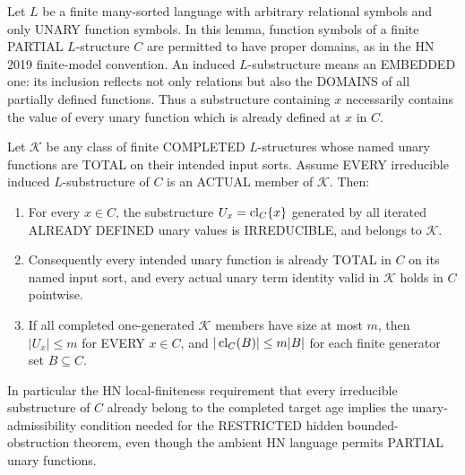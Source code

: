 \begin{lemma}
\label{lem:hn-irreducible-forces-unary-admissible}
Let $L$ be a finite many-sorted language with arbitrary
relational symbols and only UNARY function symbols.
In this lemma, function symbols of a finite PARTIAL
$L$-structure $C$ are permitted to have proper domains,
as in the HN 2019 finite-model convention.
An induced $L$-substructure means an EMBEDDED one:
its inclusion reflects not only relations but also
the DOMAINS of all partially defined functions.
Thus a substructure containing $x$ necessarily
contains the value of every unary function which
is already defined at $x$ in $C$.

Let $\mathcal K$ be any class of finite COMPLETED
$L$-structures whose named unary functions are
TOTAL on their intended input sorts.
Assume EVERY irreducible induced $L$-substructure
of $C$ is an ACTUAL member of $\mathcal K$.
Then:
\begin{enumerate}[label=(\roman*)]
\item For every $x\in C$, the substructure
$U_x=\operatorname{cl}_C\{x\}$ generated by all iterated
ALREADY DEFINED unary values is IRREDUCIBLE,
and belongs to $\mathcal K$.
\item Consequently every intended unary function
is already TOTAL in $C$ on its named input sort,
and every actual unary term identity valid in
$\mathcal K$ holds in $C$ pointwise.
\item If all completed one-generated $\mathcal K$
members have size at most $m$, then
$|U_x|\le m$ for EVERY $x\in C$, and
$|\operatorname{cl}_C(B)|\le m|B|$ for each finite
generator set $B\subseteq C$.
\end{enumerate}
In particular the HN local-finiteness requirement
that every irreducible substructure of $C$
already belong to the completed target age
implies the unary-admissibility condition needed
for the RESTRICTED hidden bounded-obstruction
theorem, even though the ambient HN language
permits PARTIAL unary functions.
\end{lemma}
